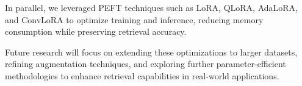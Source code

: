 \documentclass{article}
\begin{document}
In parallel, we leveraged PEFT techniques such as LoRA, QLoRA, AdaLoRA, and ConvLoRA to optimize training and inference, reducing memory consumption while preserving retrieval accuracy. 

Future research will focus on extending these optimizations to larger datasets, refining augmentation techniques, and exploring further parameter-efficient methodologies to enhance retrieval capabilities in real-world applications.




  
  
\end{document}
